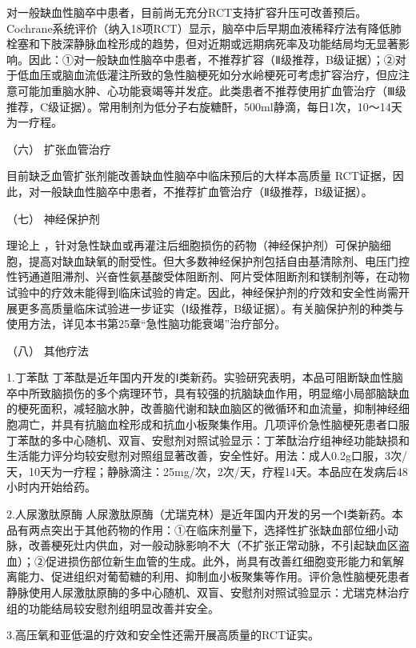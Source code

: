 对一般缺血性脑卒中患者，目前尚无充分RCT支持扩容升压可改善预后。Cochrane系统评价（纳入18项RCT）显示，脑卒中后早期血液稀释疗法有降低肺栓塞和下肢深静脉血栓形成的趋势，但对近期或远期病死率及功能结局均无显著影响。因此：①对一般缺血性脑卒中患者，不推荐扩容（Ⅱ级推荐，B级证据）；②对于低血压或脑血流低灌注所致的急性脑梗死如分水岭梗死可考虑扩容治疗，但应注意可能加重脑水肿、心功能衰竭等并发症。此类患者不推荐使用扩血管治疗（Ⅲ级推荐，C级证据）。常用制剂为低分子右旋糖酐，500ml静滴，每日1次，10～14天为一疗程。

\hypertarget{text00242.htmlux5cux23CHP8-1-2-3-4-6}{}
（六） 扩张血管治疗

目前缺乏血管扩张剂能改善缺血性脑卒中临床预后的大样本高质量
RCT证据，因此，对一般缺血性脑卒中患者，不推荐扩血管治疗（Ⅱ级推荐，B级证据）。

\hypertarget{text00242.htmlux5cux23CHP8-1-2-3-4-7}{}
（七） 神经保护剂

理论上
，针对急性缺血或再灌注后细胞损伤的药物（神经保护剂）可保护脑细胞，提高对缺血缺氧的耐受性。但大多数神经保护剂包括自由基清除剂、电压门控性钙通道阻滞剂、兴奋性氨基酸受体阻断剂、阿片受体阻断剂和镁制剂等，在动物试验中的疗效未能得到临床试验的肯定。因此，神经保护剂的疗效和安全性尚需开展更多高质量临床试验进一步证实（Ⅰ级推荐，B级证据）。有关脑保护剂的种类与使用方法，详见本书第25章“急性脑功能衰竭”治疗部分。

\hypertarget{text00242.htmlux5cux23CHP8-1-2-3-4-8}{}
（八） 其他疗法

1.丁苯酞
丁苯酞是近年国内开发的Ⅰ类新药。实验研究表明，本品可阻断缺血性脑卒中所致脑损伤的多个病理环节，具有较强的抗脑缺血作用，明显缩小局部脑缺血的梗死面积，减轻脑水肿，改善脑代谢和缺血脑区的微循环和血流量，抑制神经细胞凋亡，并具有抗脑血栓形成和抗血小板聚集作用。几项评价急性脑梗死患者口服丁苯酞的多中心随机、双盲、安慰剂对照试验显示：丁苯酞治疗组神经功能缺损和生活能力评分均较安慰剂对照组显著改善，安全性好。用法：成人0.2g口服，3次/天，10天为一疗程；静脉滴注：25mg/次，2次/天，疗程14天。本品应在发病后48小时内开始给药。

2.人尿激肽原酶
人尿激肽原酶（尤瑞克林）是近年国内开发的另一个Ⅰ类新药。本品有两点突出于其他药物的作用：①在临床剂量下，选择性扩张缺血部位细小动脉，改善梗死灶内供血，对一般动脉影响不大（不扩张正常动脉，不引起缺血区盗血）；②促进损伤部位新生血管的生成。此外，尚具有改善红细胞变形能力和氧解离能力、促进组织对葡萄糖的利用、抑制血小板聚集等作用。评价急性脑梗死患者静脉使用人尿激肽原酶的多中心随机、双盲、安慰剂对照试验显示：尤瑞克林治疗组的功能结局较安慰剂组明显改善并安全。

3.高压氧和亚低温的疗效和安全性还需开展高质量的RCT证实。

